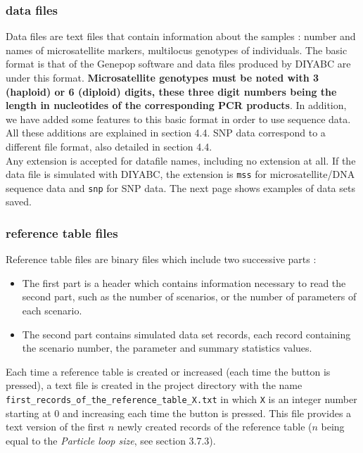 \subsubsection{data files}
Data files are text files that contain information about the samples : number and names of microsatellite markers, multilocus genotypes of individuals. The basic  format is that of the Genepop software \citep{RR1995} and data files produced by DIYABC are under this format.  \textbf{Microsatellite genotypes must be noted with 3 (haploid) or 6 (diploid) digits, these three digit numbers being the length in nucleotides of the corresponding PCR products}. In addition, we have added some features to this basic format in order to use sequence data. All these additions are explained in section 4.4. SNP data correspond to a different file format, also detailed in section 4.4.\\ 
Any extension is accepted for datafile names, including no extension at all. If the data file is simulated with DIYABC, the extension is \texttt{mss} for microsatellite/DNA sequence data and \texttt{snp} for SNP data. The next page shows examples of data sets saved.

\subsubsection{reference table files} 
Reference table files are binary files which include two successive parts :
\begin{itemize}
 \item The first part is a header which contains information necessary to read the second part, such as the number of scenarios, or the number of parameters of each scenario.
 \item The second part contains simulated data set records, each record containing the scenario number, the parameter and summary statistics values.
\end{itemize}
 
 Each time a reference table is created or increased (each time the  button is pressed), a text file is created in the project directory with the name \texttt{first\_records\_of\_the\_reference\_table\_X.txt} in which \texttt{X} is an integer number starting at 0 and increasing each time the  button is pressed. This file provides a text version of the first $n$ newly created records of the reference table ($n$ being equal to the \emph{Particle loop size}, see section 3.7.3).\\

